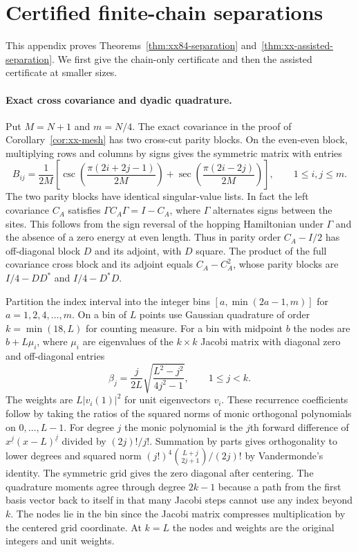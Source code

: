 \section{Certified finite-chain separations}\label{app:xx84-certificate}

This appendix proves Theorems~\ref{thm:xx84-separation}
and~\ref{thm:xx-assisted-separation}. We first give the chain-only
certificate and then the assisted certificate at smaller sizes.
\paragraph{Exact cross covariance and dyadic quadrature.}
Put $M=N+1$ and $m=N/4$. The exact covariance in the proof of
Corollary~\ref{cor:xx-mesh} has two cross-cut parity blocks. On the
even-even block, multiplying rows and columns by signs gives the symmetric
matrix with entries
\begin{equation}\label{eq:xx84-kernel}
 B_{ij}=\frac{1}{2M}\left[
 \csc\!\left(\frac{\pi(2i+2j-1)}{2M}\right)+
 \sec\!\left(\frac{\pi(2i-2j)}{2M}\right)\right],
 \qquad 1\le i,j\le m.
\end{equation}
The two parity blocks have identical singular-value lists. In fact the
left covariance $C_A$ satisfies $\Gamma C_A\Gamma=I-C_A$, where $\Gamma$
alternates signs between the sites. This follows from the sign reversal of
the hopping Hamiltonian under $\Gamma$ and the absence of a zero energy
at even length. Thus in parity order $C_A-I/2$ has off-diagonal block $D$
and its adjoint, with $D$ square. The product of the full covariance
cross block and its adjoint equals $C_A-C_A^2$, whose parity blocks are
$I/4-DD^*$ and $I/4-D^*D$.

Partition the index interval into the integer bins
$[a,\min(2a-1,m)]$ for $a=1,2,4,\ldots,m$. On a bin of $L$ points use
Gaussian quadrature of order $k=\min(18,L)$ for counting measure.
For a bin with midpoint $b$ the nodes are $b+L\mu_i$, where $\mu_i$
are eigenvalues of the $k\times k$ Jacobi matrix with diagonal zero
and off-diagonal entries
\[
 \beta_j=\frac{j}{2L}\sqrt{\frac{L^2-j^2}{4j^2-1}},\qquad 1\le j<k.
\]
The weights are $L|v_i(1)|^2$ for unit eigenvectors $v_i$. These
recurrence coefficients follow by taking the ratios of the squared
norms of monic orthogonal polynomials on $0,\ldots,L-1$. For degree $j$
the monic polynomial is the $j$th forward difference of
$x^{\underline j}(x-L)^{\underline j}$ divided by $(2j)!/j!$.
Summation by parts gives orthogonality to lower degrees and squared
norm $(j!)^4\binom{L+j}{2j+1}/(2j)!$ by Vandermonde's identity.
The symmetric grid gives the zero diagonal after centering. The
quadrature moments agree through degree $2k-1$ because a path from
the first basis vector back to itself in that many Jacobi steps cannot
use any index beyond $k$. The nodes lie in the bin since the Jacobi
matrix compresses multiplication by the centered grid coordinate.
At $k=L$ the nodes and weights are the
original integers and unit weights.

